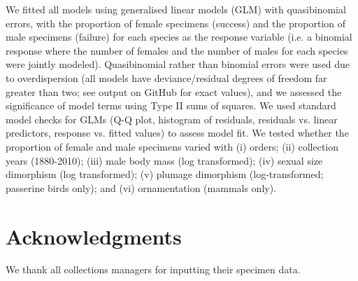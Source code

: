 \documentclass[a4paper, 12pt]{article}
\begin{document}
We fitted all models using generalised linear models (GLM) with quasibinomial errors, with the proportion of female specimens (success) and the proportion of male specimens (failure) for each species as the response variable (i.e. a binomial response where the number of females and the number of males for each species were jointly modeled). 
Quasibinomial rather than binomial errors were used due to overdispersion (all models have deviance/residual degrees of freedom far greater than two; see output on GitHub for exact values), and we assessed the significance of model terms using Type II sums of squares. 
We used standard model checks for GLMs (Q-Q plot, histogram of residuals, residuals vs. linear predictors, response vs. fitted values) to assess model fit. 
We tested whether the proportion of female and male specimens varied with (i) orders; (ii) collection years (1880-2010); (iii) male body mass (log transformed); (iv) sexual size dimorphism (log transformed); (v) plumage dimorphism (log-transformed; passerine birds only); and (vi) ornamentation (mammals only). 

\section{Acknowledgments}\label{acknowledgments}
We thank all collections managers for inputting their specimen data.




\end{document}

